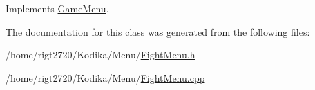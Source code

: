 Implements \hyperlink{classGameMenu_ac32ff465c5a4f30979e8851fa21cb230}{Game\-Menu}.



The documentation for this class was generated from the following files\-:\begin{DoxyCompactItemize}
\item 
/home/rigt2720/\-Kodika/\-Menu/\hyperlink{FightMenu_8h}{Fight\-Menu.\-h}\item 
/home/rigt2720/\-Kodika/\-Menu/\hyperlink{FightMenu_8cpp}{Fight\-Menu.\-cpp}\end{DoxyCompactItemize}
